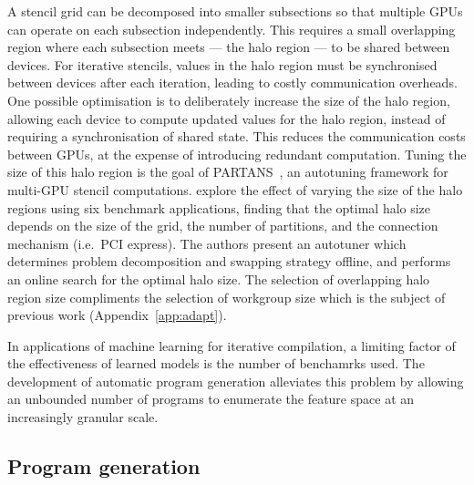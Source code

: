 A stencil grid can be decomposed into smaller subsections so that multiple GPUs can operate on each subsection independently. This requires a small overlapping region where each subsection meets --- the halo region --- to be shared between devices. For iterative stencils, values in the halo region must be synchronised between devices after each iteration, leading to costly communication overheads. One possible optimisation is to deliberately increase the size of the halo region, allowing each device to compute updated values for the halo region, instead of requiring a synchronisation of shared state. This reduces the communication costs between GPUs, at the expense of introducing redundant computation. Tuning the size of this halo region is the goal of PARTANS~\cite{Lutz2013}, an autotuning framework for multi-GPU stencil computations. \citeauthor{Lutz2013} explore the effect of varying the size of the halo regions using six benchmark applications, finding that the optimal halo size depends on the size of the grid, the number of partitions, and the connection mechanism (i.e.\ PCI express). The authors present an autotuner which determines problem decomposition and swapping strategy offline, and performs an online search for the optimal halo size. The selection of overlapping halo region size compliments the selection of workgroup size which is the subject of previous work (Appendix~\ref{app:adapt}).

In applications of machine learning for iterative compilation, a limiting factor of the effectiveness of learned models is the number of benchamrks used. The development of automatic program generation alleviates this problem by allowing an unbounded number of programs to enumerate the feature space at an increasingly granular scale.


\subsection{Program generation}

